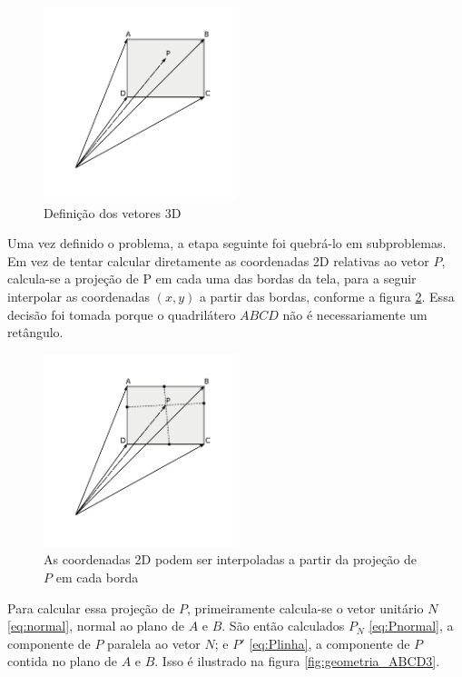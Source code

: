 \documentclass[brazil,pagestart=firstchapter]{abnt}
\begin{document}
\begin{figure}[h]
\centering
\includegraphics[width=0.5\textwidth]{img/geometria_ABCD1.pdf}
\caption{Definição dos vetores 3D}
\label{fig:geometria_ABCD1}
\end{figure}

Uma vez definido o problema, a etapa seguinte foi quebrá-lo em subproblemas.
Em vez de tentar calcular diretamente as coordenadas 2D relativas ao vetor
$P$, calcula-se a projeção de P em cada uma das bordas da tela, para a
seguir interpolar as coordenadas $(x, y)$ a partir das bordas, conforme a
figura \ref{fig:geometria_ABCD2}. Essa decisão foi tomada porque o
quadrilátero $ABCD$ não é necessariamente um retângulo.

\begin{figure}[h]
\centering
\includegraphics[width=0.5\textwidth]{img/geometria_ABCD2.pdf}
\caption{As coordenadas 2D podem ser interpoladas a partir da projeção de
$P$ em cada borda}
\label{fig:geometria_ABCD2}
\end{figure}

Para calcular essa projeção de $P$, primeiramente calcula-se o vetor
unitário $N$ \eqref{eq:normal}, normal ao plano de $A$ e $B$. São então
calculados $P_N$ \eqref{eq:Pnormal}, a componente de $P$ paralela ao vetor
$N$; e $P'$ \eqref{eq:Plinha}, a componente de $P$ contida no plano de $A$ e
$B$. Isso é ilustrado na figura \ref{fig:geometria_ABCD3}.
\end{document}
